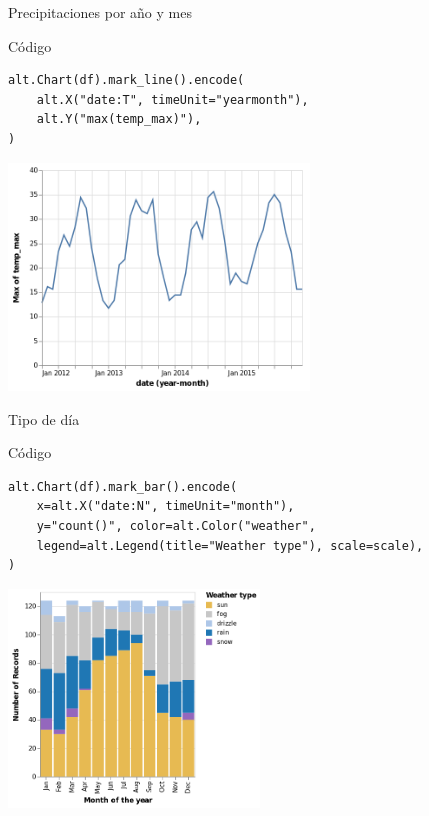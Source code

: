 \documentclass[bigger,unknownkeysallowed]{beamer}
\begin{document}
\begin{frame}[fragile,label={sec:org40a1c82}]{Precipitaciones por año y mes}
 \begin{block}{Código}
\begin{center}
\lstset{language=Python,label= ,caption= ,captionpos=b,numbers=none}
\begin{lstlisting}
alt.Chart(df).mark_line().encode(
    alt.X("date:T", timeUnit="yearmonth"),
    alt.Y("max(temp_max)"),
)
\end{lstlisting}
\end{center}
\end{block}
\begin{center}
\begin{center}
\includegraphics[width=0.6\textwidth]{seattle3.png}
\end{center}
\end{center}
\end{frame}

\begin{frame}[fragile,label={sec:orgaf2cbb6}]{Tipo de día}
 \begin{block}{Código}
\begin{center}
\lstset{language=Python,label= ,caption= ,captionpos=b,numbers=none}
\begin{lstlisting}
alt.Chart(df).mark_bar().encode(
    x=alt.X("date:N", timeUnit="month"),
    y="count()", color=alt.Color("weather",
    legend=alt.Legend(title="Weather type"), scale=scale),
)
\end{lstlisting}
\end{center}
\end{block}
\begin{center}
\begin{center}
\includegraphics[width=0.5\textwidth]{seattle5.png}
\end{center}
\end{center}
\end{frame}
\end{document}
